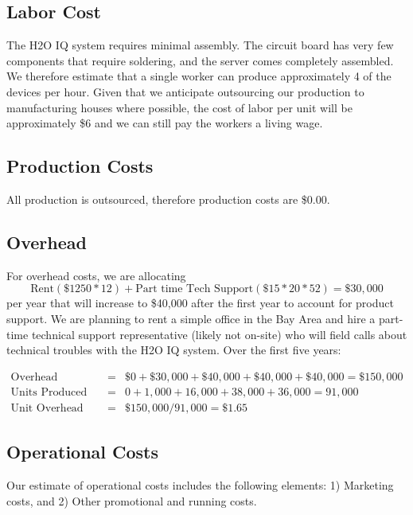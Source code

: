 \documentclass[11pt]{article}
\begin{document}
\subsection{Labor Cost}

The H2O IQ system requires minimal assembly.  The circuit board has very few components that require soldering, and the server comes completely assembled.  We therefore estimate that a single worker can produce approximately 4 of the devices per hour.  Given that we anticipate outsourcing our production to manufacturing houses where possible, the cost of labor per unit will be approximately \$6 and we can still pay the workers a living wage.

\subsection{Production Costs}

All production is outsourced, therefore production costs are \$0.00.

\subsection{Overhead}

For overhead costs, we are allocating $$\textrm{Rent} (\$1250 * 12) + \textrm{Part time Tech Support} (\$15*20*52) = \$30,000$$ per year that will increase to \$40,000 after the first year to account for product support.  We are planning to rent a simple office in the Bay Area and hire a part-time technical support representative (likely not on-site) who will field calls about technical troubles with the H2O IQ system. Over the first five years:

\begin{eqnarray*}
\textrm{Overhead} &=& \$0 + \$30,000 + \$40,000 + \$40,000 + \$40,000 = \$150,000 \\
\textrm{Units Produced Over 5 Years} &=&0 + 1,000 + 16,000 + 38,000 + 36,000 = 91,000\\
\textrm{Unit Overhead Cost} &=& \$150,000/91,000 = \$1.65
\end{eqnarray*}

\subsection{Operational Costs}

Our estimate of operational costs includes the following elements: 1) Marketing costs, and 2) Other promotional and running costs.
\end{document}

